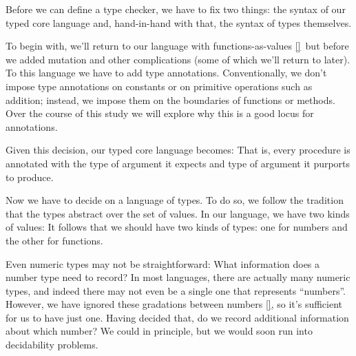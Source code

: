 
Before we can define a type checker, we have to fix two things: the syntax of
our typed core language and, hand-in-hand with that, the syntax of types
themselves.

To begin with, we’ll return to our language with functions-as-values \ref{}\ but
before we added mutation and other complications (some of which we’ll return to
later). To this language we have to add type annotations. Conventionally, we
don’t impose type annotations on constants or on primitive operations such as
addition; instead, we impose them on the boundaries of functions or methods.
Over the course of this study we will explore why this is a good locus for
annotations.

Given this decision, our typed core language becomes:
That is, every procedure is annotated with the type of argument it expects and
type of argument it purports to produce.

Now we have to decide on a language of types. To do so, we follow the tradition
that the types abstract over the set of values. In our language, we have two
kinds of values:
It follows that we should have two kinds of types: one for numbers and the other
for functions.

Even numeric types may not be straightforward: What information does a number
type need to record? In most languages, there are actually many numeric types,
and indeed there may not even be a single one that represents “numbers”.
However, we have ignored these gradations between numbers \ref{}, so it’s
sufficient for us to have just one. Having decided that, do we record additional
information about which number? We could in principle, but we would soon run
into decidability problems.

